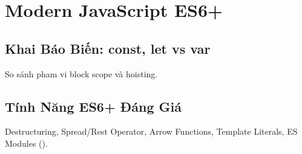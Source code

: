 \chapter{Modern JavaScript ES6+}
\label{chap:es6_modern}

\section{Khai Báo Biến: const, let vs var}
So sánh pham vi block scope và hoisting.

\section{Tính Năng ES6+ Đáng Giá}
Destructuring, Spread/Rest Operator, Arrow Functions, Template Literals, ES Modules ().
